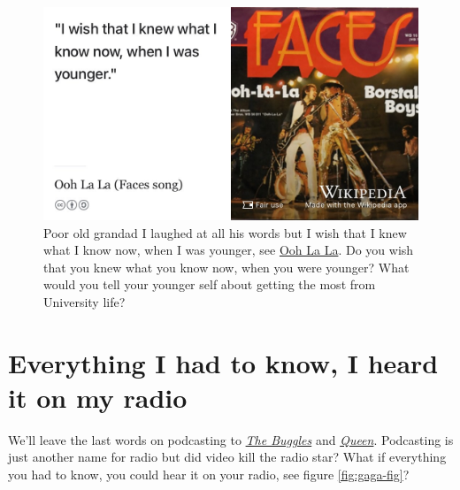 \documentclass[
]{book}
\begin{document}
\begin{figure}

{\centering \includegraphics[width=0.99\linewidth]{images/faces} 

}

\caption{Poor old grandad I laughed at all his words but I wish that I knew what I know now, when I was younger, see \href{https://en.wikipedia.org/wiki/Ooh_La_La_(Faces_song)}{Ooh La La}. \citep{faces} Do you wish that you knew what you know now, when you were younger? What would you tell your younger self about getting the most from University life?}\label{fig:faces2-fig}
\end{figure}



\hypertarget{queen}{%
\section{Everything I had to know, I heard it on my radio}\label{queen}}

We'll leave the last words on podcasting to \emph{\href{https://en.wikipedia.org/wiki/The_Buggles}{The Buggles}} and \emph{\href{https://en.wikipedia.org/wiki/Queen_(band)}{Queen}}. Podcasting is just another name for radio but did video kill the radio star? \citep{videokilled} What if everything you had to know, you could hear it on your radio, see figure \ref{fig:gaga-fig}?
\end{document}
